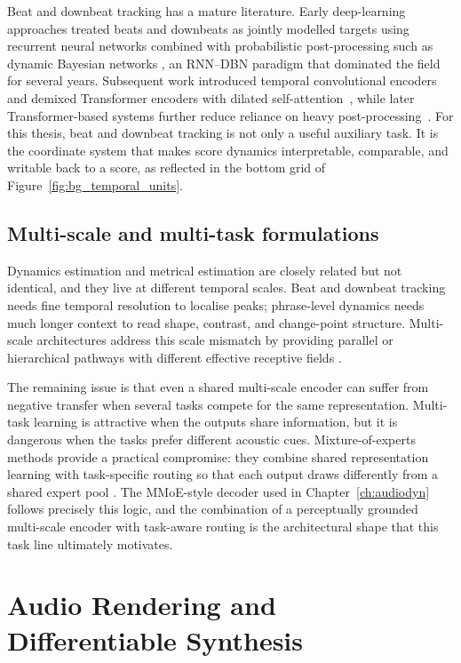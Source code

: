 Beat and downbeat tracking has a mature literature. Early deep-learning approaches treated beats and downbeats as jointly modelled targets using recurrent neural networks combined with probabilistic post-processing such as dynamic Bayesian networks \cite{bock2016joint}, an RNN--DBN paradigm that dominated the field for several years. Subsequent work introduced temporal convolutional encoders~\cite{bock2020deconstruct} and demixed Transformer encoders with dilated self-attention~\cite{zhao2022beat}, while later Transformer-based systems further reduce reliance on heavy post-processing~\cite{foscarin2024beat}. For this thesis, beat and downbeat tracking is not only a useful auxiliary task. It is the coordinate system that makes score dynamics interpretable, comparable, and writable back to a score, as reflected in the bottom grid of Figure~\ref{fig:bg_temporal_units}.

\subsection{Multi-scale and multi-task formulations}
\label{sec:bg:scoredyn:joint}

Dynamics estimation and metrical estimation are closely related but not identical, and they live at different temporal scales. Beat and downbeat tracking needs fine temporal resolution to localise peaks; phrase-level dynamics needs much longer context to read shape, contrast, and change-point structure. Multi-scale architectures address this scale mismatch by providing parallel or hierarchical pathways with different effective receptive fields \cite{li2023frame}.

The remaining issue is that even a shared multi-scale encoder can suffer from negative transfer when several tasks compete for the same representation. Multi-task learning is attractive when the outputs share information, but it is dangerous when the tasks prefer different acoustic cues. Mixture-of-experts methods provide a practical compromise: they combine shared representation learning with task-specific routing so that each output draws differently from a shared expert pool \cite{ma2018mmoe}. The MMoE-style decoder used in Chapter~\ref{ch:audiodyn} follows precisely this logic, and the combination of a perceptually grounded multi-scale encoder with task-aware routing is the architectural shape that this task line ultimately motivates.

\section{Audio Rendering and Differentiable Synthesis}
\label{sec:bg:synthesis}

